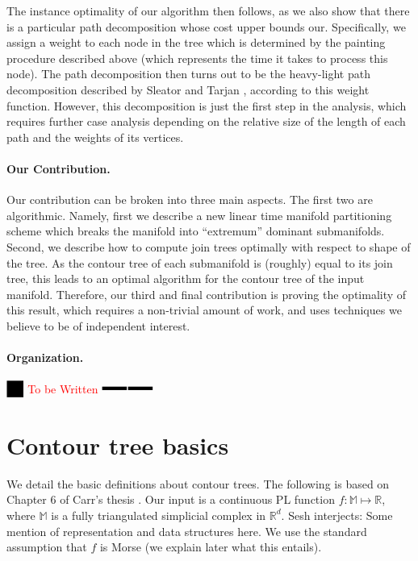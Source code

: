 \documentclass[11pt]{article}
\theoremstyle{definition}
\newcommand{\MM}{\mathbb{M}}
\newcommand{\RR}{\mathbb{R}}
\newcommand{\Reminder}[1]{{\color{red}#1}}
\newcommand{\Sesh}[1]{\Reminder{Sesh interjects: #1}}
\newcommand{\XSays}[2]{{
      {$\rule[-0.12cm]{0.2in}{0.5cm}$\fbox{\tt
            #1:} }
      \textcolor{red}{#2}
      \marginpar{\textcolor{blue}{#1}}
      {$\rule[0.1cm]{0.3in}{0.1cm}$\fbox{\tt
            end}$\rule[0.1cm]{0.3in}{0.1cm}$}
      }
   }
\newcommand{\Ben}[1]{{\XSays{Ben}{#1}}}
\begin{document}
The instance optimality of our algorithm then follows, as we also show that there is a particular path decomposition 
whose cost upper bounds our.  Specifically, we assign a weight to each node in the tree which is determined by 
the painting procedure described above (which represents the time it takes to process this node).  
The path decomposition then turns out to be the heavy-light path decomposition 
described by Sleator and Tarjan \cite{st-dsdt-83}, according to this weight function.
However, this decomposition is just the first step in the analysis, which 
requires further case analysis depending on the relative size of the length of each path 
and the weights of its vertices.

\paragraph{Our Contribution.}
Our contribution can be broken into three main aspects.  The first two are algorithmic.  Namely, 
first we describe a new linear time manifold partitioning scheme which breaks the manifold into 
``extremum'' dominant submanifolds.  
Second, we describe how to compute join trees optimally with respect to shape of the tree.
As the contour tree of each submanifold is (roughly) equal to its join tree, this leads to an 
optimal algorithm for the contour tree of the input manifold.  
Therefore, our third and final contribution is proving the optimality of this result, which 
requires a non-trivial amount of work, and uses techniques we believe to be of independent interest.

\paragraph{Organization.}
\Ben{To be Written}

\section{Contour tree basics} \label{sec:basics}

We detail the basic definitions about contour trees. The following is based on Chapter 6 of Carr's thesis \cite{c-tmi-04}.
Our input is a continuous PL function $f:\MM \mapsto \RR$, where $\MM$ is a fully triangulated simplicial complex in $\RR^d$. 
\Sesh{Some mention of representation and data structures here.}
We use the standard assumption that $f$ is Morse (we explain later what this entails). 
\end{document}

